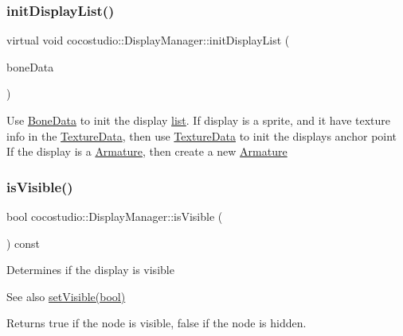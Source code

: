 \subsubsection{\texorpdfstring{init\+Display\+List()}{initDisplayList()}\hspace{0.1cm}{\footnotesize\ttfamily [2/2]}}
{\footnotesize\ttfamily virtual void cocostudio\+::\+Display\+Manager\+::init\+Display\+List (\begin{DoxyParamCaption}\item[{\hyperlink{classcocostudio_1_1BoneData}{Bone\+Data} $\ast$}]{bone\+Data }\end{DoxyParamCaption})\hspace{0.3cm}{\ttfamily [virtual]}}

Use \hyperlink{classcocostudio_1_1BoneData}{Bone\+Data} to init the display \hyperlink{protocollist-p}{list}. If display is a sprite, and it have texture info in the \hyperlink{classcocostudio_1_1TextureData}{Texture\+Data}, then use \hyperlink{classcocostudio_1_1TextureData}{Texture\+Data} to init the display\textquotesingle{}s anchor point If the display is a \hyperlink{classcocostudio_1_1Armature}{Armature}, then create a new \hyperlink{classcocostudio_1_1Armature}{Armature} \mbox{\label{classcocostudio_1_1DisplayManager_a2ca302efee924451e3f190af4430fe9b}} 
\subsubsection{\texorpdfstring{is\+Visible()}{isVisible()}\hspace{0.1cm}{\footnotesize\ttfamily [1/2]}}
{\footnotesize\ttfamily bool cocostudio\+::\+Display\+Manager\+::is\+Visible (\begin{DoxyParamCaption}{ }\end{DoxyParamCaption}) const\hspace{0.3cm}{\ttfamily [virtual]}}

Determines if the display is visible

\begin{DoxySeeAlso}{See also}
\hyperlink{classcocostudio_1_1DisplayManager_adc59452ab69d55229d2fce06320379cb}{set\+Visible(bool)} 
\end{DoxySeeAlso}
\begin{DoxyReturn}{Returns}
true if the node is visible, false if the node is hidden. 
\end{DoxyReturn}
\mbox{\label{classcocostudio_1_1DisplayManager_a4dfa9159cc012bbc466e6c41b39efc36}} 
